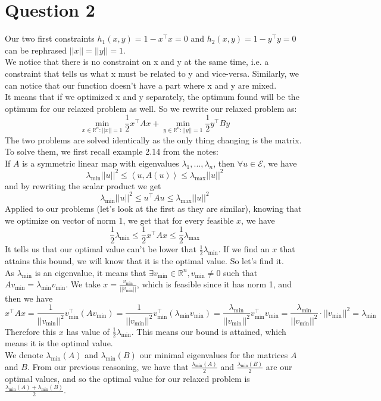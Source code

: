 \documentclass{article}
\newcommand{\R}{\mathbb{R}}
\newcommand{\tp}{^\top}
\begin{document}
\section*{Question 2}

Our two first constraints $h_1(x,y)=1-x\tp x =0$ and $h_2(x,y)=1-y\tp y =0$ can be rephrased $||x||=||y||=1$.\\
We notice that there is no constraint on x and y at the same time, i.e. a constraint that tells us what x must be related to y and vice-versa. Similarly, we can notice that our function doesn't have a part where x and y are mixed.\\
It means that if we optimized x and y separately, the optimum found will be the optimum for our relaxed problem as well. So we rewrite our relaxed problem as:
$$\min_{x\in \R^n:||x||=1}  \frac{1}{2} x\tp A x +\min_{y \in \R^n:||y||=1} \frac{1}{2} y\tp B y$$
The two problems are solved identically as the only thing changing is the matrix. To solve them, we first recall example 2.14 from the notes:\\
If $A$ is a symmetric linear map with eigenvalues $\lambda_1, ...,\lambda_n$, then $\forall u \in \mathcal{E}$, we have $$\lambda_{\min} ||u||^2 \leq \left< u, A(u)\right>\leq \lambda_{\max}||u||^2$$
and by rewriting the scalar product we get 
$$\lambda_{\min} ||u||^2 \leq u\tp A u \leq \lambda_{\max} ||u||^2$$
Applied to our problems (let's look at the first as they are similar), knowing that we optimize on vector of norm 1, we get that for every feasible $x$, we have
$$\frac{1}{2}\lambda_{\min}  \leq\frac{1}{2} x\tp A x \leq\frac{1}{2} \lambda_{\max} $$
It tells us that our optimal value can't be lower that $\frac{1}{2} \lambda_{\min}$. If we find an $x$ that attains this bound, we will know that it is the optimal value. So let's find it.\\
As $\lambda_{\min}$ is an eigenvalue, it means that $\exists v_{\min} \in \R^n, v_{\min} \neq 0$ such that $A v_{\min}=\lambda_{\min} v_{\min}$. We take $x=\frac{v_{\min}}{||v_{\min}||}$, which is feasible since it has norm 1, and then we have
$$x\tp A x =\frac{1}{||v_{\min}||^2} v_{\min}\tp \left( A v_{\min} \right)=\frac{1}{||v_{\min}||^2} v_{\min}\tp (\lambda_{\min} v_{\min})=\frac{\lambda_{\min}}{||v_{\min}||^2} v_{\min}\tp v_{\min}=\frac{\lambda_{\min}}{||v_{\min}||^2} \cdot ||v_{\min}||^2=\lambda_{\min}$$
Therefore this $x$ has value of $\frac{1}{2}\lambda_{\min} $. This means our bound is attained, which means it is the optimal value.\\
We denote $\lambda_{\min} (A)$ and $\lambda_{\min} (B)$ our minimal eigenvalues for the matrices $A$ and $B$. From our previous reasoning, we have that $\frac{\lambda_{\min} (A)}{2}$ and $\frac{\lambda_{\min} (B)}{2}$ are our optimal values, and so the optimal value for our relaxed problem is $\frac{\lambda_{\min} (A)+\lambda_{\min} (B)}{2}$.
\end{document}
